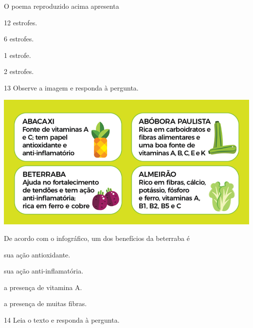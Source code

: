 
O poema reproduzido acima apresenta

\begin{escolha}
  \item 12 estrofes.

  \item 6 estrofes.

  \item 1 estrofe.

  \item 2 estrofes.
\end{escolha}


\num{13} Observe a imagem e responda à pergunta.

\includegraphics[width=\textwidth]{./imgQ4PORT/media/image4.png}


De acordo com o infográfico, um dos benefícios da beterraba é

\begin{escolha}
  \item sua ação antioxidante.

  \item sua ação anti-inflamatória.

  \item a presença de vitamina A.

  \item a presença de muitas fibras.
\end{escolha}


\num{14} Leia o texto e responda à pergunta.

